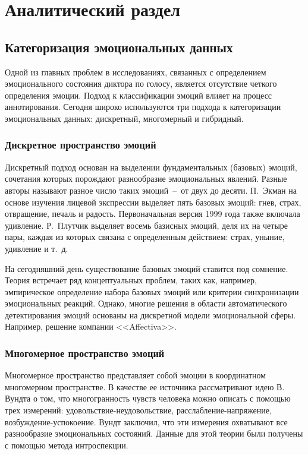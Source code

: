 \chapter{Аналитический раздел}
\section{Категоризация эмоциональных данных}
Одной из главных проблем в исследованиях, связанных с определением эмоционального состояния диктора по голосу, является отсутствие четкого определения эмоции. Подход к классификации эмоций влияет на процесс аннотирования. Сегодня широко используются три подхода к категоризации эмоциональных данных: дискретный, многомерный и гибридный.
\subsection{Дискретное пространство эмоций}
Дискретный подход основан на выделении фундаментальных (базовых) эмоций, сочетания которых порождают разнообразие эмоциональных явлений. Разные авторы называют разное число таких эмоций~--~от двух до десяти. П.~Экман на основе изучения лицевой экспрессии выделяет пять базовых эмоций: гнев, страх, отвращение, печаль и радость. Первоначальная версия 1999 года также включала удивление. \cite{Ekman1972, Ekman1992} Р.~Плутчик \cite{Plutchik1980} выделяет восемь базисных эмоций, деля их на четыре пары, каждая из которых связана с определенным действием: страх, уныние, удивление и т.~д. 

На сегодняшний день существование базовых эмоций ставится под сомнение. Теория встречает ряд концептуальных проблем, таких как, например, эмпирическое определение набора базовых эмоций или критерии синхронизации эмоциональных реакций. Однако, многие решения в области автоматического детектирования эмоций основаны на дискретной модели эмоциональной сферы. Например, решение компании <<Affectiva>>.~\cite{Affectica}

\subsection{Многомерное пространство эмоций}
Многомерное пространство представляет собой эмоции в координатном многомерном пространстве. В качестве ее источника рассматривают идею В. Вундта о том, что многогранность чувств
человека можно описать с помощью трех измерений: удовольствие-неудовольствие, расслабление-напряжение, возбуждение-успокоение. Вундт заключил, \cite{Вундт1984} что эти измерения охватывают все разнообразие эмоциональных состояний. Данные для этой теории были получены с помощью метода интроспекции.


